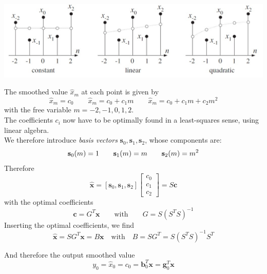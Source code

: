 \begin{center}
	\includegraphics[width=\linewidth]{images/SignProcApp_SavitzkyGolay.jpg}
\end{center}

The smoothed value $\hat{x}_m$ at each point is given by
\begin{equation*}
	\hat{x}_m = c_0 \qquad \hat{x}_m = c_0 + c_1 m \qquad \hat{x}_m = c_0 + c_1 m + c_2 m^2
\end{equation*}
with the free variable $m = -2,-1,0,1,2$. \\

The coefficients $c_i$ now have to be
optimally found in a least-squares sense, using linear algebra. \\

We  therefore introduce \emph{basis vectors} 
$\mathbf{s}_0, \mathbf{s}_1, \mathbf{s}_2$, whose components are:
\begin{equation*}
	\mathbf{s}_0(m) = 1 \qquad \mathbf{s}_1(m) = m \qquad \mathbf{s}_2(m) = m^2 \\
\end{equation*}
Therefore
\begin{equation*}
	\hat{\mathbf{x}} = \left[\mathbf{s}_0,\mathbf{s}_1,\mathbf{s}_2\right] 
	\begin{bmatrix}c_0\\c_1\\c_2\end{bmatrix} = S\mathbf{c}
\end{equation*}
with the optimal coefficients
\begin{equation*}
	\mathbf{c} = G^T \mathbf{x} \qquad \text{with} \qquad G = S \left(S^T S \right)^{-1}
\end{equation*}
Inserting the optimal coefficients, we find
\begin{equation*}
	\hat{\mathbf{x}} = S G^T \mathbf{x} = B \mathbf{x} \quad \text{with} \quad B = S G^T = S \left(S^T S\right)^{-1} S^T
\end{equation*}

And therefore the output smoothed value
\begin{equation*}
	y_0 = \hat{x}_0 = c_0 = \mathbf{b}_0^T \mathbf{x} = \mathbf{g}_0^T \mathbf{x}
\end{equation*}

